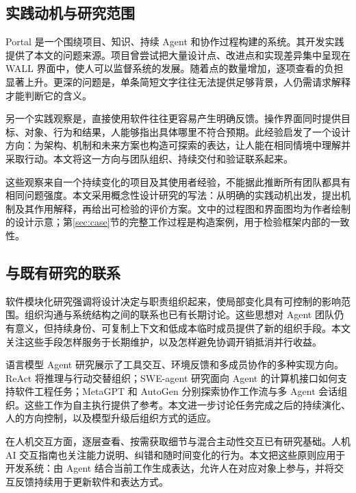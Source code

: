 
\subsection{实践动机与研究范围}
Portal 是一个围绕项目、知识、持续 Agent 和协作过程构建的系统。其开发实践提供了本文的问题来源。项目曾尝试把大量设计点、改进点和实现差异集中呈现在 WALL 界面中，使人可以监督系统的发展。随着点的数量增加，逐项查看的负担显著上升。更深的问题是，单条简短文字往往无法提供足够背景，人仍需请求解释才能判断它的含义。

另一个实践观察是，直接使用软件往往更容易产生明确反馈。操作界面同时提供目标、对象、行为和结果，人能够指出具体哪里不符合预期。此经验启发了一个设计方向：为架构、机制和未来方案也构造可探索的表达，让人能在相同情境中理解并采取行动。本文将这一方向与团队组织、持续交付和验证联系起来。

这些观察来自一个持续变化的项目及其使用者经验，不能据此推断所有团队都具有相同问题强度。本文采用概念性设计研究的写法：从明确的实践动机出发，提出机制及其作用解释，再给出可检验的评价方案。文中的过程图和界面图均为作者绘制的设计示意；第\ref{sec:case}节的完整工作过程是构造案例，用于检验框架内部的一致性。

\subsection{与既有研究的联系}
软件模块化研究强调将设计决定与职责组织起来，使局部变化具有可控制的影响范围\cite{parnas1972}。组织沟通与系统结构之间的联系也已有长期讨论\cite{conway1968}。这些思想对 Agent 团队仍有意义，但持续身份、可复制上下文和低成本临时成员提供了新的组织手段。本文关注这些手段怎样服务于长期维护，以及怎样避免协调开销抵消并行收益。

语言模型 Agent 研究展示了工具交互、环境反馈和多成员协作的多种实现方向。ReAct 将推理与行动交替组织\cite{react}；SWE-agent 研究面向 Agent 的计算机接口如何支持软件工程任务\cite{sweagent}；MetaGPT 和 AutoGen 分别探索协作工作流与多 Agent 会话组织\cite{metagpt,autogen}。这些工作为自主执行提供了参考。本文进一步讨论任务完成之后的持续演化、人的方向控制，以及模型升级后组织方式的适应。

在人机交互方面，逐层查看、按需获取细节与混合主动性交互已有研究基础\cite{shneiderman1996,horvitz1999}。人机 AI 交互指南也关注能力说明、纠错和随时间变化的行为\cite{amershi2019}。本文把这些原则应用于开发系统：由 Agent 结合当前工作生成表达，允许人在对应对象上参与，并将交互反馈持续用于更新软件和表达方式。

